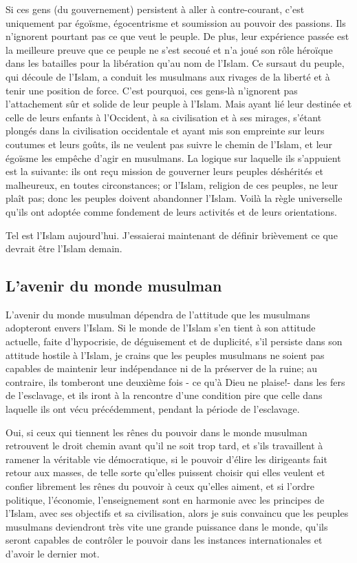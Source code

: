 Si ces gens (du gouvernement) persistent à aller à contre-courant, c'est
uniquement par égoïsme, égocentrisme et soumission au pouvoir des
passions. Ils n'ignorent pourtant pas ce que veut le peuple. De plus,
leur expérience passée est la meilleure preuve que ce peuple ne s'est
secoué et n'a joué son rôle héroïque dans les batailles pour la
libération qu'au nom de l'Islam. Ce sursaut du peuple, qui découle de
l'Islam, a conduit les musulmans aux rivages de la liberté et à tenir
une position de force. C'est pourquoi, ces gens-là n'ignorent pas
l'attachement sûr et solide de leur peuple à l'Islam. Mais ayant lié
leur destinée et celle de leurs enfants à l'Occident, à sa civilisation
et à ses mirages, s'étant plongés dans la civilisation occidentale et
ayant mis son empreinte sur leurs coutumes et leurs goûts, ils ne
veulent pas suivre le chemin de l'Islam, et leur égoïsme les empêche
d'agir en musulmans. La logique sur laquelle ils s'appuient est la
suivante: ils ont reçu mission de gouverner leurs peuples déshérités et
malheureux, en toutes circonstances; or l'Islam, religion de ces
peuples, ne leur plaît pas; donc les peuples doivent abandonner l'Islam.
Voilà la règle universelle qu'ils ont adoptée comme fondement de leurs
activités et de leurs orientations.

Tel est l'Islam aujourd'hui. J'essaierai maintenant de définir
brièvement ce que devrait être l'Islam demain.


\hypertarget{lavenir-du-monde-musulman}{%
\subsection{L'avenir du monde
musulman}\label{lavenir-du-monde-musulman}}


L'avenir du monde musulman dépendra de l'attitude que les musulmans
adopteront envers l'Islam. Si le monde de l'Islam s'en tient à son
attitude actuelle, faite d'hypocrisie, de déguisement et de duplicité,
s'il persiste dans son attitude hostile à l'Islam, je crains que les
peuples musulmans ne soient pas capables de maintenir leur indépendance
ni de la préserver de la ruine; au contraire, ils tomberont une deuxième
fois - ce qu'à Dieu ne plaise!- dans les fers de l'esclavage, et ils
iront à la rencontre d'une condition pire que celle dans laquelle ils
ont vécu précédemment, pendant la période de l'esclavage.

Oui, si ceux qui tiennent les rênes du pouvoir dans le monde musulman
retrouvent le droit chemin avant qu'il ne soit trop tard, et s'ils
travaillent à ramener la véritable vie démocratique, si le pouvoir
d'élire les dirigeants fait retour aux masses, de telle sorte qu'elles
puissent choisir qui elles veulent et confier librement les rênes du
pouvoir à ceux qu'elles aiment, et si l'ordre politique, l'économie,
l'enseignement sont en harmonie avec les principes de l'Islam, avec ses
objectifs et sa civilisation, alors je suis convaincu que les peuples
musulmans deviendront très vite une grande puissance dans le monde,
qu'ils seront capables de contrôler le pouvoir dans les instances
internationales et d'avoir le dernier mot.

